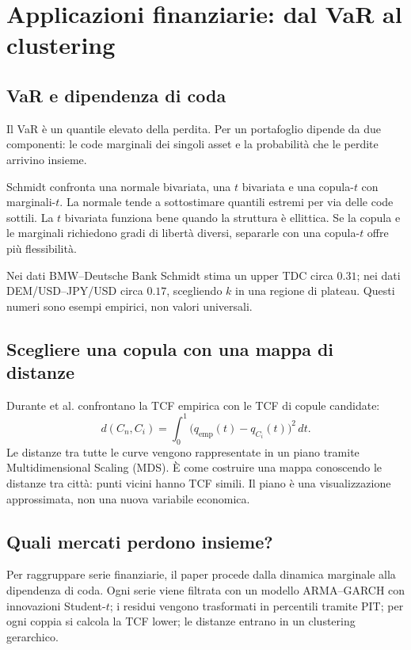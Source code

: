 \documentclass[11pt,a4paper]{article}
\begin{document}
\section{Applicazioni finanziarie: dal VaR al clustering}

\subsection{VaR e dipendenza di coda}

Il VaR è un quantile elevato della perdita. Per un portafoglio dipende da due
componenti: le code marginali dei singoli asset e la probabilità che le perdite
arrivino insieme.

Schmidt confronta una normale bivariata, una $t$ bivariata e una copula-$t$
con marginali-$t$. La normale tende a sottostimare quantili estremi per via
delle code sottili. La $t$ bivariata funziona bene quando la struttura è
ellittica. Se la copula e le marginali richiedono gradi di libertà diversi,
separarle con una copula-$t$ offre più flessibilità.

Nei dati BMW--Deutsche Bank Schmidt stima un upper TDC circa $0.31$; nei dati
DEM/USD--JPY/USD circa $0.17$, scegliendo $k$ in una regione di plateau. Questi
numeri sono esempi empirici, non valori universali.

\subsection{Scegliere una copula con una mappa di distanze}

Durante et al. confrontano la TCF empirica con le TCF di copule candidate:
\begin{equation}
 d(C_n,C_i)=\int_0^1
 \bigl(q_{\mathrm{emp}}(t)-q_{C_i}(t)\bigr)^2\,dt.
 \label{eq:tcf-distance}
\end{equation}
Le distanze tra tutte le curve vengono rappresentate in un piano tramite
Multidimensional Scaling (MDS). È come costruire una mappa conoscendo le
distanze tra città: punti vicini hanno TCF simili. Il piano è una
visualizzazione approssimata, non una nuova variabile economica.

\subsection{Quali mercati perdono insieme?}

Per raggruppare serie finanziarie, il paper procede dalla dinamica marginale
alla dipendenza di coda. Ogni serie viene filtrata con un modello ARMA--GARCH
con innovazioni Student-$t$; i residui vengono trasformati in percentili tramite
PIT; per ogni coppia si calcola la TCF lower; le distanze entrano in un
clustering gerarchico.
\end{document}
